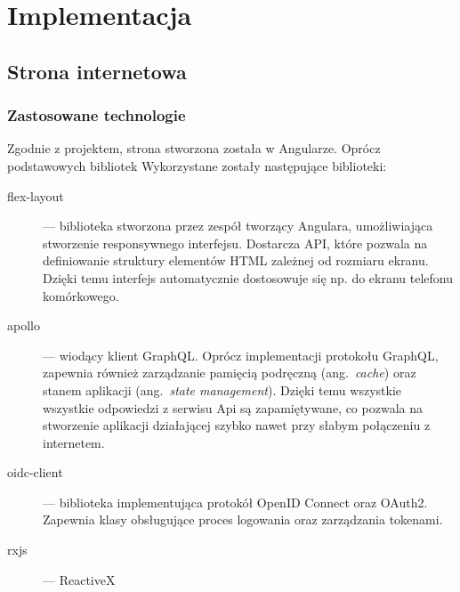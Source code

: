 \chapter{Implementacja}
\section{Strona internetowa}
	\subsection{Zastosowane technologie}
		Zgodnie z projektem, strona stworzona została w Angularze.
		Oprócz podstawowych bibliotek Wykorzystane zostały następujące biblioteki:
		\begin{description}
			\item[flex-layout] --- biblioteka stworzona przez zespół tworzący Angulara, umożliwiająca stworzenie responsywnego interfejsu.
				Dostarcza API, które pozwala na definiowanie struktury elementów HTML zależnej od rozmiaru ekranu.
				Dzięki temu interfejs automatycznie dostosowuje się np. do ekranu telefonu komórkowego.

			\item[apollo] --- wiodący klient GraphQL. Oprócz implementacji protokołu GraphQL,
				zapewnia również zarządzanie pamięcią podręczną (ang.\ \emph{cache}) oraz stanem aplikacji (ang.\ \emph{state management}).
				Dzięki temu wszystkie wszystkie odpowiedzi z serwisu Api są zapamiętywane,
				co pozwala na stworzenie aplikacji działającej szybko nawet przy słabym połączeniu z internetem.

			\item[oidc-client] --- biblioteka implementująca protokół OpenID Connect oraz OAuth2.
				Zapewnia klasy obsługujące proces logowania oraz zarządzania tokenami.

			\item[rxjs] --- ReactiveX 
		\end{description}
